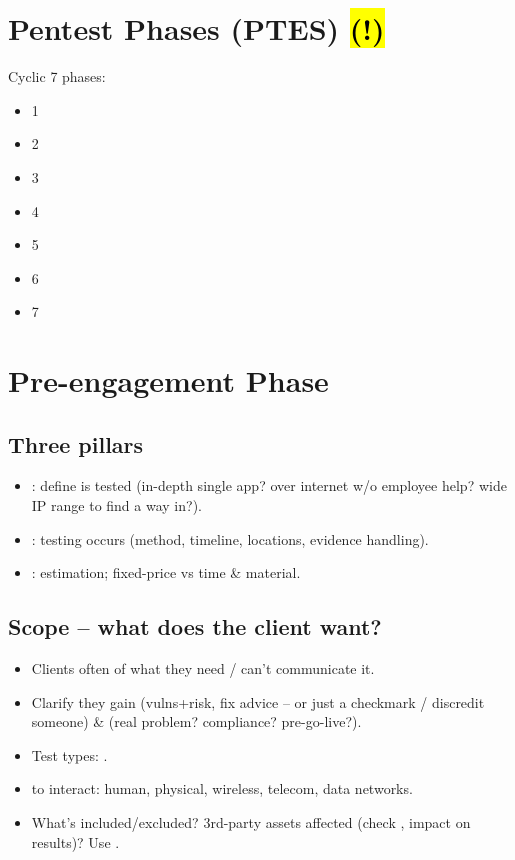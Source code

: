 \section{Pentest Phases (PTES) \hl{(!)}}
Cyclic 7 phases:
\begin{itemize}
\item 1 
\item 2 
\item 3 
\item 4 
\item 5 
\item 6 
\item 7 
\end{itemize}

\section{Pre-engagement Phase}

\subsection{Three pillars}
\begin{itemize}
\item {}: define  is tested (in-depth single app? over internet w/o employee help? wide IP range to find a way in?).
\item {}:  testing occurs (method, timeline, locations, evidence handling).
\item {}: estimation; fixed-price vs time \& material.
\end{itemize}

\subsection{Scope -- what does the client want?}
\begin{itemize}
\item Clients often  of what they need / can't communicate it.
\item Clarify  they gain (vulns+risk, fix advice -- or just a checkmark / discredit someone) \&  (real problem? compliance? pre-go-live?).
\item Test types: .
\item {} to interact: human, physical, wireless, telecom, data networks.
\item What's included/excluded? 3rd-party assets affected (check , impact on results)? Use .
\end{itemize}

